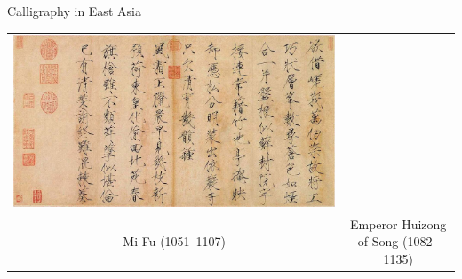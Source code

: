 \documentclass[xetex]{beamer}
\begin{document}
\begin{frame}{Calligraphy in East Asia}
\begin{center}
\begin{tabular}{cc}
                                                                                        \includegraphics[height=0.5\textheight]{pics/Songhuizong.jpg} \\
      
      Mi Fu (1051–1107) & Emperor Huizong of Song (1082–1135)
    \end{tabular}
  \end{center}
\end{frame}
\end{document}
